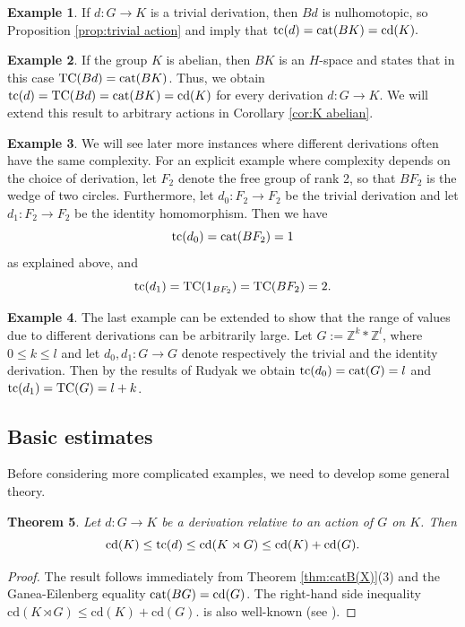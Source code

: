 \documentclass[11pt]{amsart}
\theoremstyle{plain}
\newtheorem{theorem}{Theorem}[section]
\theoremstyle{definition}
\newtheorem{example}[theorem]{Example}
\newcommand{\ZZ}{{\mathbb{Z}}}
\newcommand{\cat}{\mathop{\rm cat}\nolimits}
\newcommand{\tc}{\mathop{\rm tc}\nolimits}
\newcommand{\TC}{\mathop{\rm TC}\nolimits}
\newcommand{\cd}{\mathrm{cd}}
\begin{document}
\begin{example}\label{ex:trivial derivation}
If $d\colon G\to K$ is a trivial derivation, then $Bd$ is nulhomotopic, so Proposition \ref{prop:trivial action}
and \cite[Thm. 13.20(3)]{Pavesic2024} imply that $\tc(d)=\cat(BK)=\cd(K).$    
\end{example}

\begin{example}\label{ex:trivial action with abelian kernel}
If the group $K$ is abelian, then $BK$ is an $H$-space and \cite[Thm. 13.20(8)]{Pavesic2024}   
states that in this case $\TC(Bd)=\cat(BK)$. Thus, we obtain $\tc(d)=\TC(Bd)=\cat(BK)=\cd(K)$ for 
every derivation $d\colon G\to K$. We will extend this result to arbitrary actions in 
Corollary \ref{cor:K abelian}.
\end{example}


\begin{example}\label{ex:F2 identity}
We will see later more instances where different derivations often have the same complexity. 
For an explicit example where complexity depends on the choice of derivation, let $F_2$ denote the 
free group
of rank 2, so that $BF_2$ is the wedge of two circles. Furthermore, let $d_0\colon F_2\to F_2$ be 
the trivial 
derivation and let $d_1\colon F_2\to F_2$ be the identity homomorphism. Then we have
$$\tc(d_0)=\cat(BF_2)=1$$
as explained above, and
$$\tc(d_1)=\TC(1_{BF_2})=\TC(BF_2)=2.$$
\end{example}

\begin{example}\label{ex:Rudyak}
The last example can be extended to show that the range of values due to different 
derivations can be arbitrarily large. Let $G:=\ZZ^k\ast\ZZ^l$, where $0\le k\le l$ and let
$d_0,d_1\colon G\to G$ denote respectively the trivial and the identity derivation.
Then by the results of Rudyak \cite{Rudyak2016} we obtain 
$\tc(d_0)=\cat(G)=l$ and $\tc(d_1)=\TC(G)=l+k$.
\end{example}

  

\subsection{Basic estimates}
Before considering more complicated examples, we need to develop some general theory. 

\begin{theorem}\label{thm:cd estimates for tc}
Let $d\colon G\to K$ be a derivation relative to an action of $G$ on $K$. Then
$$\cd(K)\le\tc(d)\le \cd(K\rtimes G)\le\cd(K)+\cd(G).$$
\end{theorem}
\begin{proof}
The result follows immediately from Theorem \ref{thm:catB(X)}(3) and the Ganea-Eilenberg
equality $\cat(BG)=\cd(G)$. The right-hand side inequality  $\cd(K\rtimes G)\le\cd(K)+\cd(G).$
is also well-known (see \cite[Prop.VIII.2.4]{Brown}).
\end{proof}
\end{document}
